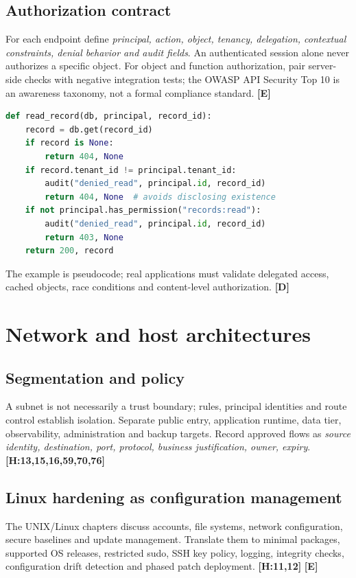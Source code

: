 \documentclass[10pt,letterpaper,oneside]{article}
\newcommand{\handbookref}[1]{\textsf{\color{accent}\textbf{[H:#1]}}}
\newcommand{\modernext}{\textsf{\color{muted}\textbf{[E]}}}
\newcommand{\designed}{\textsf{\color{accent}\textbf{[D]}}}
\begin{document}
\subsection{Authorization contract}
For each endpoint define \emph{principal, action, object, tenancy, delegation, contextual constraints, denial behavior and audit fields}. An authenticated session alone never authorizes a specific object. For object and function authorization, pair server-side checks with negative integration tests; the OWASP API Security Top 10 is an awareness taxonomy, not a formal compliance standard. \modernext{}
\begin{lstlisting}[language=Python,caption={Illustrative server-side object authorization}]
def read_record(db, principal, record_id):
    record = db.get(record_id)
    if record is None:
        return 404, None
    if record.tenant_id != principal.tenant_id:
        audit("denied_read", principal.id, record_id)
        return 404, None  # avoids disclosing existence
    if not principal.has_permission("records:read"):
        audit("denied_read", principal.id, record_id)
        return 403, None
    return 200, record
\end{lstlisting}
The example is pseudocode; real applications must validate delegated access, cached objects, race conditions and content-level authorization. \designed{}

\section{Network and host architectures}
\subsection{Segmentation and policy}
A subnet is not necessarily a trust boundary; rules, principal identities and route control establish isolation. Separate public entry, application runtime, data tier, observability, administration and backup targets. Record approved flows as \emph{source identity, destination, port, protocol, business justification, owner, expiry}. \handbookref{13,15,16,59,70,76}
\subsection{Linux hardening as configuration management}
The UNIX/Linux chapters discuss accounts, file systems, network configuration, secure baselines and update management. Translate them to minimal packages, supported OS releases, restricted sudo, SSH key policy, logging, integrity checks, configuration drift detection and phased patch deployment. \handbookref{11,12} \modernext{}
\end{document}

